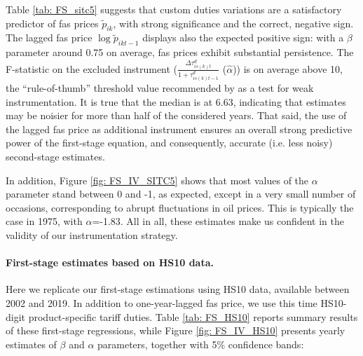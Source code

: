 \documentclass[a4paper,11pt]{article}
\begin{document}

Table \ref{tab: FS_sitc5} suggests that custom duties variations are a satisfactory predictor of fas prices $\widetilde{p}_{ik}$, with strong significance and the correct, negative sign. The lagged fas price $\log \widetilde{p}_{ikt-1}$ displays also the expected positive sign: with a $\beta$ parameter around 0.75 on average, fas prices exhibit substantial persistence. The F-statistic on the excluded instrument ($\frac{\Delta \tau^d_{is(k)t}}{1+\tau_{is(k)t-1}^d}$ ($\widehat{\alpha}$)) is on average above 10, the ``rule-of-thumb'' threshold value recommended by \cite{staiger_stock} as a test for weak instrumentation. It is true that the median is at 6.63, indicating that estimates may be noisier for more than half of the considered years. That said, the use of the lagged fas price as additional instrument ensures an overall strong predictive power of the first-stage equation, and consequently, accurate (i.e. less noisy) second-stage estimates.

In addition, Figure \ref{fig: FS_IV_SITC5} shows that most values of the $\alpha$ parameter stand between 0 and -1, as expected, except in a very small number of occasions, corresponding to abrupt fluctuations in oil prices. This is typically the case in 1975, with $\alpha$=-1.83. All in all, these estimates make us confident in the validity of our instrumentation strategy.



\paragraph{First-stage estimates based on HS10 data.}

Here we replicate our first-stage estimations using HS10 data, available between 2002 and 2019. In addition to one-year-lagged fas price, we use this time HS10-digit product-specific tariff duties. Table \ref{tab: FS_HS10} reports summary results of these first-stage regressions, while Figure \ref{fig: FS_IV_HS10} presents yearly estimates of $\beta$ and $\alpha$ parameters, together with 5\% confidence bands:
\end{document}
